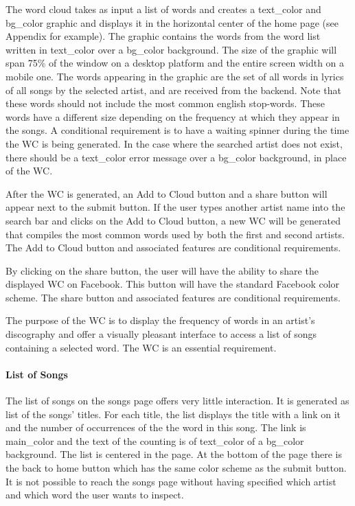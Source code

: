\documentclass[]{article}
\begin{document}
The word cloud takes as input a list of words and creates a text\_color
and bg\_color graphic and displays it in the horizontal center of the
home page (see Appendix for example). The graphic contains the words
from the word list written in text\_color over a bg\_color background.
The size of the graphic will span 75\% of the window on a desktop
platform and the entire screen width on a mobile one. The words
appearing in the graphic are the set of all words in lyrics of all songs
by the selected artist, and are received from the backend. Note that
these words should not include the most common english stop-words. These
words have a different size depending on the frequency at which they
appear in the songs. A conditional requirement is to have a waiting
spinner during the time the WC is being generated. In the case where the
searched artist does not exist, there should be a text\_color error
message over a bg\_color background, in place of the WC.

After the WC is generated, an Add to Cloud button and a share button
will appear next to the submit button. If the user types another artist
name into the search bar and clicks on the Add to Cloud button, a new WC
will be generated that compiles the most common words used by both the
first and second artists. The Add to Cloud button and associated
features are conditional requirements.

By clicking on the share button, the user will have the ability to share
the displayed WC on Facebook. This button will have the standard
Facebook color scheme. The share button and associated features are
conditional requirements.

The purpose of the WC is to display the frequency of words in an
artist's discography and offer a visually pleasant interface to access a
list of songs containing a selected word. The WC is an essential
requirement.

\paragraph{List of Songs}\label{list-of-songs}

The list of songs on the songs page offers very little interaction. It
is generated as list of the songs' titles. For each title, the list
displays the title with a link on it and the number of occurrences of
the the word in this song. The link is main\_color and the text of the
counting is of text\_color of a bg\_color background. The list is
centered in the page. At the bottom of the page there is the back to
home button which has the same color scheme as the submit button. It is
not possible to reach the songs page without having specified which
artist and which word the user wants to inspect.
\end{document}
